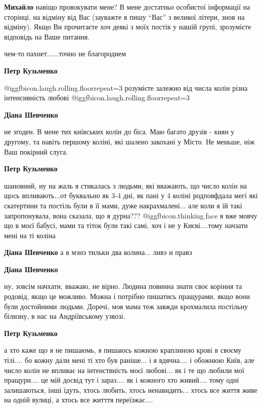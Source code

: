 \begin{itemize}
\begin{itemize}
\textbf{Михайло} навіщо провокувати мене? В мене достатньо особистої інформації на
сторінці, на відміну від Вас (зауважте я пишу \enquote{Вас} з великої літери, знов на
відміну). Якщо Ви прочитаєте хоч деякі з моїх постів у нашій групі, зрозумієте
відповідь на Ваше питання.

чем-то пахнет......точно не благородием

\textbf{Петр Кузьменко}  

@igg{fbicon.laugh.rolling.floor}{repeat=3} розумієте залежно від числа колін
різна інтенсивність любові @igg{fbicon.laugh.rolling.floor}{repeat=3} 

\begin{itemize} %
\textbf{Діана Шевченко} 

не згоден. В мене тих київських колін до біса. Маю багато друзів - киян у
другому, та навіть першому коліні, які шалено закохані у Місто. Не меньше, ніж
Ваш покірний слуга.


\textbf{Петр Кузьменко} 

шановний, ну на жаль я стикалась з людьми, які вважають, що число колін на щось
впливають...от буквально як 3-4 дні, як пані у 4 коліні родповфдала мегі які
скатертини та постіль були в її мами, дуже накрахмалені... але коли я їй такі
запропонувала, вона сказала, що я дурна??? @igg{fbicon.thinking.face}  я вже мовчу що в моєї бабусі,
мами та тіток були такі самі, хоч і не у Києві....тому начзати мені на ті
коліна

\textbf{Діана Шевченко} а в мэнэ тильки два колина... ливэ и правэ

\textbf{Діана Шевченко} 

ну, зовсім начхати, вважаю, не вірно. Людина повинна знати своє коріння та
родовід, якщо це можливо. Можна і потрібно пишатись пращурами, якщо вони були
достойними людьми. Доречі, моя мама теж завжди крохмалила постільну білизну, в
нас на Андріївському узвозі.

\textbf{Петр Кузьменко} 

а хто каже що я не пишаюмь, я пишаюсь кожною краплиною крові в своєму
тілі.... бо кожну дали мені ті хто був раніше... і я вдячна.... і обожнюю Київ,
але число колін не впливає на інтенствність моєї любові... як і те що любили мої
пращури.... це мій досвід тут і зараз.... як і кожного хто живий.... тому одні
залишаються, інші їдуть, хтось любить, хтось ненавидить... хтось все життя живе
на одній вулиці, а хтось все житття переїзжає....


\end{itemize}
\end{itemize}
\end{itemize}
